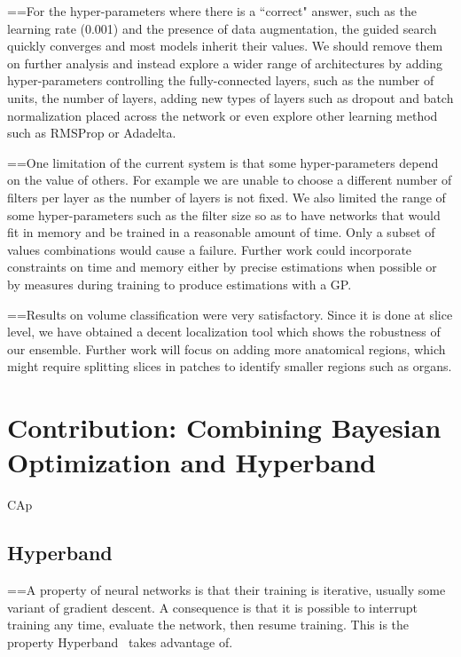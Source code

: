 ==For the hyper-parameters where there is a ``correct" answer, such as the learning rate (0.001) and the presence of data augmentation, the guided search quickly converges and most models inherit their values. We should remove them on further analysis and instead explore a wider range of architectures by adding hyper-parameters controlling the fully-connected layers, such as the number of units, the number of layers, adding new types of layers such as dropout and batch normalization placed across the network or even explore other learning method such as RMSProp or Adadelta. 

==One limitation of the current system is that some hyper-parameters depend on the value of others. For example we are unable to choose a different number of filters per layer as the number of layers is not fixed. We also limited the range of some hyper-parameters such as the filter size so as to have networks that would fit in memory and be trained in a reasonable amount of time. Only a subset of values combinations would cause a failure. Further work could incorporate constraints on time and memory either by precise estimations when possible or by measures during training to produce estimations with a GP. 

==Results on volume classification were very satisfactory. Since it is done at slice level, we have obtained a decent localization tool which shows the robustness of our ensemble. Further work will focus on adding more anatomical regions, which might require splitting slices in patches to identify smaller regions such as organs.

\section{Contribution: Combining Bayesian Optimization and Hyperband}

CAp

\subsection{Hyperband}
\label{ssec:hyperband}

==A property of neural networks is that their training is iterative, usually some variant of gradient descent. A consequence is that it is possible to interrupt training any time, evaluate the network, then resume training. This is the property Hyperband~\cite{li2017ICLR} takes advantage of.

